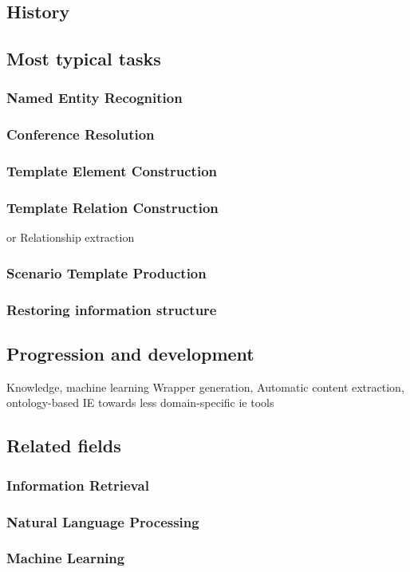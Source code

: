\newpage
\subsection{History}

\newpage
\subsection{Most typical tasks}

\subsubsection{Named Entity Recognition}

\subsubsection{Conference Resolution}

\subsubsection{Template Element Construction}

\subsubsection{Template Relation Construction}
or Relationship extraction

\subsubsection{Scenario Template Production}

\subsubsection{Restoring information structure}

\newpage
\subsection{Progression and development}

Knowledge, machine learning
Wrapper generation, Automatic content extraction, ontology-based IE
towards less domain-specific ie tools

\newpage
\subsection{Related fields}

\subsubsection{Information Retrieval}

\subsubsection{Natural Language Processing}

\subsubsection{Machine Learning}
